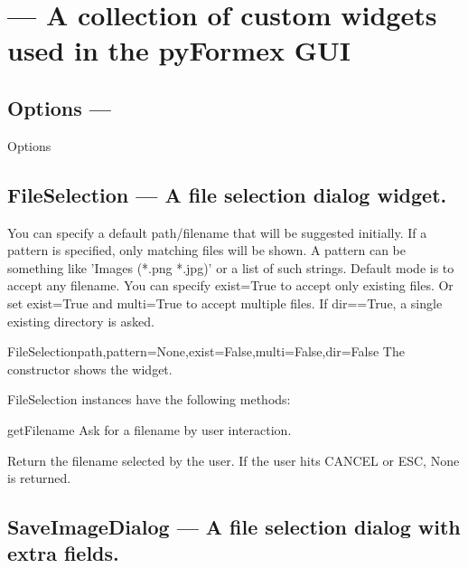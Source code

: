 

\section{ --- A collection of custom widgets used in the pyFormex GUI}
\label{sec:widgets}




\subsection{Options --- }


\begin{classdesc}{Options}{}

\end{classdesc}

\subsection{FileSelection --- A file selection dialog widget.}
    You can specify a default path/filename that will be suggested initially.
    If a pattern is specified, only matching files will be shown.
    A pattern can be something like 'Images (*.png *.jpg)' or a list
    of such strings.
    Default mode is to accept any filename. You can specify exist=True
    to accept only existing files. Or set exist=True and multi=True to
    accept multiple files.
    If dir==True, a single existing directory is asked.
    

\begin{classdesc}{FileSelection}{path,pattern=None,exist=False,multi=False,dir=False}
The constructor shows the widget.
\end{classdesc}

FileSelection instances have the following methods:

\begin{funcdesc}{getFilename}{}
Ask for a filename by user interaction.

        Return the filename selected by the user.
        If the user hits CANCEL or ESC, None is returned.
        
\end{funcdesc}

\subsection{SaveImageDialog --- A file selection dialog with extra fields.}



